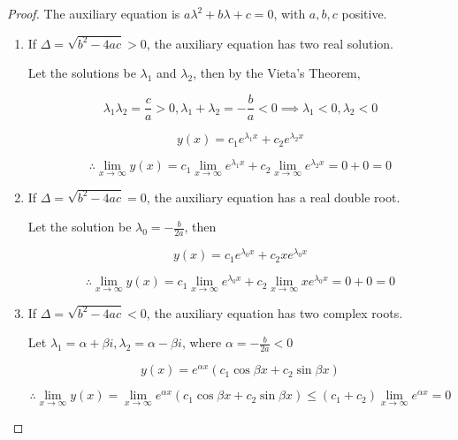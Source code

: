 \documentclass{article}
\begin{document}
  \begin{proof}
    The auxiliary equation is $a\lambda^2 + b\lambda + c = 0$, with $a, b, c$ positive.

    \begin{enumerate}

      \item If $\Delta = \sqrt{b^2 - 4ac} > 0$, the auxiliary equation has two real solution.

        Let the solutions be $\lambda_1$ and $\lambda_2$, then by the Vieta's Theorem,

        $$\lambda_1 \lambda_2 = \frac{c}{a} > 0, \lambda_1 + \lambda_2 = -\frac{b}{a} < 0 \implies \lambda_1 < 0, \lambda_2 < 0$$

        $$y(x) = c_1 e^{\lambda_1 x} + c_2e^{\lambda_2 x}$$

        $$\therefore \lim_{x \to \infty} y(x) = c_1 \lim_{x \to \infty} e^{\lambda_1 x} + c_2 \lim_{x \to \infty} e^{\lambda_2 x} = 0 + 0 = 0$$

      \item If $\Delta = \sqrt{b^2 - 4ac} = 0$, the auxiliary equation has a real double root.

        Let the solution be $\lambda_0 = -\frac{b}{2a}$, then

        $$y(x) = c_1 e^{\lambda_0 x} + c_2 x e^{\lambda_0 x}$$

        $$\therefore \lim_{x \to \infty} y(x) = c_1 \lim_{x \to \infty} e^{\lambda_0 x} + c_2 \lim_{x \to \infty} x e^{\lambda_0 x} = 0 + 0 = 0$$
      
      \item If $\Delta = \sqrt{b^2 - 4ac} < 0$, the auxiliary equation has two complex roots.

        Let $\lambda_1 = \alpha + \beta i, \lambda_2 = \alpha  - \beta i$, where $\alpha = -\frac{b}{2a} < 0$

        $$y(x) = e^{\alpha x} (c_{1} \cos \beta x + c_2 \sin \beta x)$$

        $$\therefore \lim_{x \to \infty} y(x) = \lim_{x \to \infty} e^{\alpha x} (c_1 \cos \beta x  + c_2 \sin \beta x) \leq (c_1 + c_2) \lim_{x \to \infty} e^{\alpha x} = 0$$

    \end{enumerate}


    $$
  \end{proof}
\end{document}
